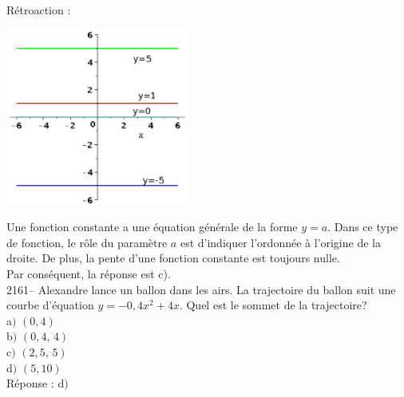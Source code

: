 \documentclass[letterpaper, 12pt]{article}
\begin{document}
R\'etroaction :\\
\begin{center}
 \includegraphics[width=6cm,bb=14 14 415 415]{Q2160.eps}
\end{center}
Une fonction constante a une \'equation g\'en\'erale de la forme $y=a$. Dans ce type de fonction, le r\^ole du param\`etre $a$ est d'indiquer l'ordonn\'ee \`a l'origine de la droite. De plus, la pente d'une fonction constante est toujours nulle.\\
Par cons\'equent, la r\'eponse est c).\\

2161--  Alexandre lance un ballon dans les airs. La trajectoire du ballon suit une courbe d'\'equation $y=-0,4x^{2}+4x$. Quel est le sommet de la trajectoire?\\

a$)$ $(0, 4)$\\
b$)$ $(0,4,\, 4)$\\
c$)$ $(2,5,\, 5)$\\
d$)$ $(5, 10)$\\

R\'eponse : d$)$\\
\end{document}
